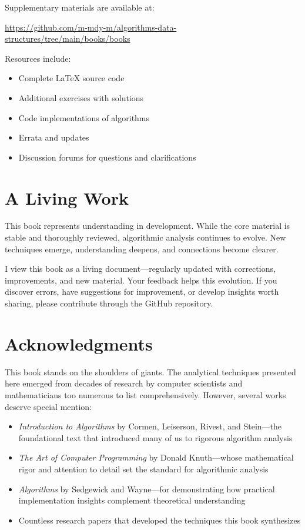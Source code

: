 Supplementary materials are available at:

\begin{center}
    \url{https://github.com/m-mdy-m/algorithms-data-structures/tree/main/books/books}
\end{center}

Resources include:
\begin{itemize}
    \item Complete LaTeX source code
    \item Additional exercises with solutions
    \item Code implementations of algorithms
    \item Errata and updates
    \item Discussion forums for questions and clarifications
\end{itemize}

\section*{A Living Work}

This book represents understanding in development. While the core material is stable and thoroughly reviewed, algorithmic analysis continues to evolve. New techniques emerge, understanding deepens, and connections become clearer.

I view this book as a living document—regularly updated with corrections, improvements, and new material. Your feedback helps this evolution. If you discover errors, have suggestions for improvement, or develop insights worth sharing, please contribute through the GitHub repository.

\section*{Acknowledgments}

This book stands on the shoulders of giants. The analytical techniques presented here emerged from decades of research by computer scientists and mathematicians too numerous to list comprehensively. However, several works deserve special mention:

\begin{itemize}
    \item \textit{Introduction to Algorithms} by Cormen, Leiserson, Rivest, and Stein—the foundational text that introduced many of us to rigorous algorithm analysis
    \item \textit{The Art of Computer Programming} by Donald Knuth—whose mathematical rigor and attention to detail set the standard for algorithmic analysis
    \item \textit{Algorithms} by Sedgewick and Wayne—for demonstrating how practical implementation insights complement theoretical understanding
    \item Countless research papers that developed the techniques this book synthesizes
\end{itemize}

